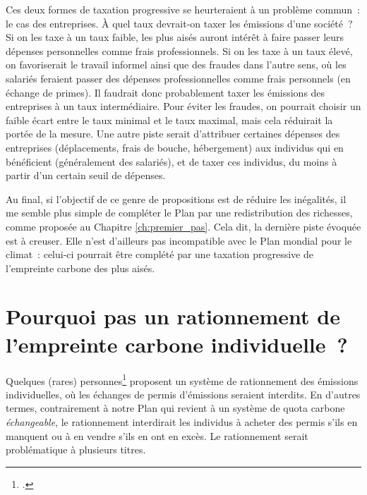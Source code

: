 \documentclass[a5paper,french]{memoir}
\begin{document}
Ces deux formes de taxation progressive se heurteraient à un problème commun~: le cas des entreprises. À quel taux devrait-on taxer les émissions d'une société~? Si on les taxe à un taux faible, les plus aisés auront intérêt à faire passer leurs dépenses personnelles comme frais professionnels. Si on les taxe à un taux élevé, on favoriserait le travail informel ainsi que des fraudes dans l'autre sens, où les salariés feraient passer des dépenses professionnelles comme frais personnels (en échange de primes). Il faudrait donc probablement taxer les émissions des entreprises à un taux intermédiaire. Pour éviter les fraudes, on pourrait choisir un faible écart entre le taux minimal et le taux maximal, mais cela réduirait la portée de la mesure. Une autre piste serait d'attribuer certaines dépenses des entreprises (déplacements, frais de bouche, hébergement) aux individus qui en bénéficient (généralement des salariés), et de taxer ces individus, du moins à partir d'un certain seuil de dépenses. 

Au final, si l'objectif de ce genre de propositions est de réduire les inégalités, il me semble plus simple de compléter le Plan par une redistribution des richesses, comme proposée au Chapitre \ref{ch:premier_pas}. Cela dit, la dernière piste évoquée est à creuser. Elle n'est d'ailleurs pas incompatible avec le Plan mondial pour le climat~: celui-ci pourrait être complété par une taxation progressive de l'empreinte carbone des plus aisés. 

\section*{\normalsize Pourquoi pas un rationnement de l'empreinte carbone individuelle~?}\label{q:rationnement}

Quelques (rares) personnes\footnote{\cite{wood_rationing_2023}.} proposent un système de rationnement des émissions individuelles, où les échanges de permis d'émissions seraient interdits. En d'autres termes, contrairement à notre Plan qui revient à un système de quota carbone \textit{échangeable}, le rationnement interdirait les individus à acheter des permis s'ils en manquent ou à en vendre s'ils en ont en excès. %
Le rationnement serait problématique à plusieurs titres. 
\end{document}
